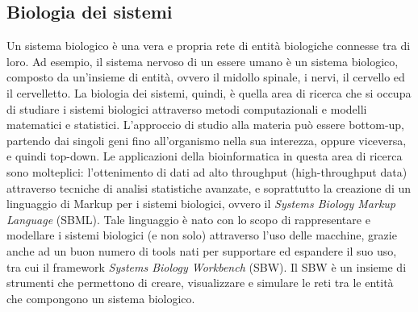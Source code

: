 \subsection{Biologia dei sistemi}
Un sistema biologico è una vera e propria rete di entità biologiche connesse tra di loro. Ad esempio, il sistema nervoso di un essere umano è un sistema biologico, composto da un'insieme di entità, ovvero il midollo spinale, i nervi, il cervello ed il cervelletto.
\newline
La biologia dei sistemi, quindi, è quella area di ricerca che si occupa di studiare i sistemi biologici attraverso metodi computazionali e modelli matematici e statistici. L'approccio di studio alla materia può essere bottom-up, partendo dai singoli geni fino all'organismo nella sua interezza, oppure viceversa, e quindi top-down.
\newline
Le applicazioni della bioinformatica in questa area di ricerca sono molteplici: l'ottenimento di dati ad alto throughput (high-throughput data) attraverso tecniche di analisi statistiche avanzate, e soprattutto la creazione di un linguaggio di Markup per i sistemi biologici, ovvero il \textit{Systems Biology Markup Language} (SBML)\cite{SBML}. Tale linguaggio è nato con lo scopo di rappresentare e modellare i sistemi biologici (e non solo) attraverso l'uso delle macchine, grazie anche ad un buon numero di tools nati per supportare ed espandere il suo uso, tra cui il framework \textit{Systems Biology Workbench} (SBW)\cite{SBW}. Il SBW è un insieme di strumenti che permettono di creare, visualizzare e simulare le reti tra le entità che compongono un sistema biologico.

